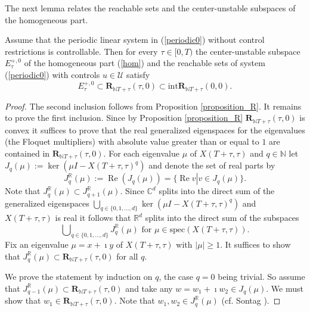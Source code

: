 \documentclass{siamltex}%
\begin{document}
The next lemma relates the reachable sets and the center-unstable subspaces of
the homogeneous part.

\begin{lemma}
\label{Lemma_subbundle}Assume that the periodic linear system in
(\ref{periodic0}) without control restrictions is controllable.\textbf{ }Then
for every $\tau\in\lbrack0,T)$ the center-unstable subspace $E_{\tau}^{+,0}$
of the homogeneous part (\ref{hom}) and the reachable sets of system
(\ref{periodic0}) with controls $u\in\mathcal{U}$ satisfy%
\[
E_{\tau}^{+,0}\subset\mathbf{R}_{\mathbb{N}T+\tau}(\tau,0)\subset
\mathrm{int}\mathbf{R}_{\mathbb{N}T+\tau}(0,0).
\]

\end{lemma}

\begin{proof}
The second inclusion follows from Proposition \ref{proposition_R}. It remains
to prove the first inclusion. Since by Proposition \ref{proposition_R}
$\mathbf{R}_{\mathbb{N}T+\tau}(\tau,0)$ is convex it suffices to prove that
the real generalized eigenspaces for the eigenvalues (the Floquet multipliers)
with absolute value greater than or equal to $1$ are contained in
$\mathbf{R}_{\mathbb{N}T+\tau}(\tau,0)$. For each eigenvalue $\mu$ of
$X(T+\tau,\tau)$ and $q\in\mathbb{N}$ let $J_{q}(\mu):=\ker(\mu I-X(T+\tau
,\tau)^{q})$ and denote the set of real parts by%
\[
J_{q}^{\mathbb{R}}(\mu):=\operatorname{Re}(J_{q}(\mu))=\{\operatorname{Re}%
v\left\vert v\in J_{q}(\mu)\right.  \}.
\]
Note that $J_{q}^{\mathbb{R}}(\mu)\subset J_{q+1}^{\mathbb{R}}(\mu)$. Since
$\mathbb{C}^{d}$ splits into the direct sum of the generalized eigenspaces
$\bigcup_{q\in\{0,1,\ldots,d\}}\ker(\mu I-X(T+\tau,\tau)^{q})$ and
$X(T+\tau,\tau)$ is real it follows that $\mathbb{R}^{d}$ splits into the
direct sum of the subspaces%
\[
\bigcup\nolimits_{q\in\{0,1,\ldots,d\}}J_{q}^{\mathbb{R}}(\mu)\text{ for }%
\mu\in\mathrm{spec}(X(T+\tau,\tau)).
\]
Fix an eigenvalue $\mu=x+\imath y$ of $X(T+\tau,\tau)$ with $\left\vert
\mu\right\vert \geq1$. It suffices to show that $J_{q}^{\mathbb{R}}%
(\mu)\subset\mathbf{R}_{\mathbb{N}T+\tau}(\tau,0)$ for all $q$.

We prove the statement by induction on $q$, the case $q=0$ being trivial. So
assume that $J_{q-1}^{\mathbb{R}}(\mu)\subset\mathbf{R}_{\mathbb{N}T+\tau
}(\tau,0)$ and take any $w=w_{1}+\imath w_{2}\in J_{q}(\mu)$. We must show
that $w_{1}\in\mathbf{R}_{\mathbb{N}T+\tau}(\tau,0)$. Note that $w_{1}%
,w_{2}\in J_{q}^{\mathbb{R}}(\mu)$ (cf. Sontag \cite[p. 119]{Son98}).


\end{proof}
\end{document}
